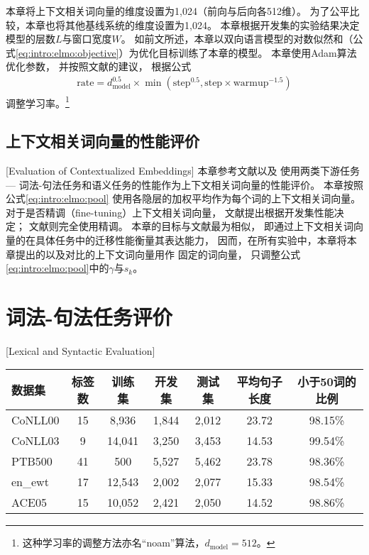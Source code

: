 本章将上下文相关词向量的维度设置为1,024（前向与后向各512维）。
为了公平比较，本章也将其他基线系统的维度设置为1,024。
本章根据开发集的实验结果决定模型的层数$L$与窗口宽度$W$。
如前文所述，本章以双向语言模型的对数似然和（公式\ref{eq:intro:elmo:objective}）为优化目标训练了本章的模型。
本章使用Adam算法\cite{DBLP:journals/corr/KingmaB14}优化参数，
并按照文献的建议，
根据公式
\begin{align}
\text{rate} = d_{\text{model}}^{0.5} \times \min (\text{step}^{0.5}, \text{step} \times \text{warmup}^{-1.5})
\end{align}
调整学习率。\footnote{这种学习率的调整方法亦名``noam''算法，$d_{\text{model}}=512$。}


\subsection{上下文相关词向量的性能评价}[Evaluation of Contextualized Embeddings]
本章参考文献以及
使用两类下游任务 --- 词法-句法任务和语义任务的性能作为上下文相关词向量的性能评价。
本章按照公式\ref{eq:intro:elmo:pool}
使用各隐层的加权平均作为每个词的上下文相关词向量。
对于是否精调（fine-tuning）上下文相关词向量，
文献提出根据开发集性能决定；
文献则完全使用精调。
本章的目标与文献最为相似，
即通过上下文相关词向量的在具体任务中的迁移性能衡量其表达能力，
因而，在所有实验中，本章将本章提出的以及对比的上下文词向量用作
固定的词向量，
只调整公式\ref{eq:intro:elmo:pool}中的$\gamma$与$s_k$。

\section{词法-句法任务评价}[Lexical and Syntactic Evaluation]\label{sec:elmo:syn-eval}
\begin{table}[t]
	\vspace{0.5em}\centering\wuhao
	\begin{tabular}{l cccccc}
		\toprule[1.5pt]
		数据集 & 标签数 & 训练集 & 开发集 & 测试集 & 平均句子长度 & 	小于50词的比例 \\
		\midrule[1pt]
		CoNLL00 & 15 & 8,936 & 1,844 & 2,012 & 23.72 & 98.15\% \\
		CoNLL03 & 9 & 14,041 & 3,250 & 3,453 & 14.53 & 99.54\% \\
		PTB500 & 41 & 500 & 5,527 & 5,462 & 23.78 & 98.36\% \\
		en\_ewt & 17 & 12,543 & 2,002 & 2,077 & 15.33 & 98.54\% \\
		ACE05 & 15 & 10,052 & 2,421 & 2,050 & 14.52 & 98.86\% \\
		\bottomrule[1.5pt]
	\end{tabular}
\end{table}

